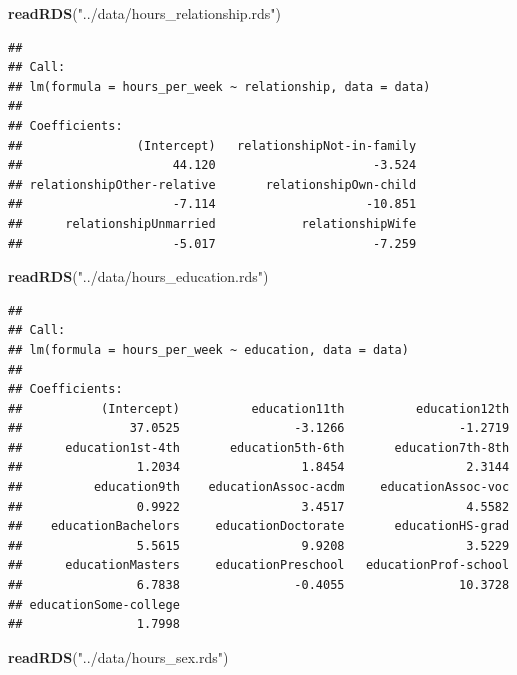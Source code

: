 \documentclass[]{article}
\newenvironment{Shaded}{\begin{snugshade}}{\end{snugshade}}
\newcommand{\KeywordTok}[1]{\textcolor[rgb]{0.13,0.29,0.53}{\textbf{#1}}}
\newcommand{\NormalTok}[1]{#1}
\newcommand{\StringTok}[1]{\textcolor[rgb]{0.31,0.60,0.02}{#1}}
\begin{document}
\begin{Shaded}
\begin{Highlighting}[]
\KeywordTok{readRDS}\NormalTok{(}\StringTok{"../data/hours\_relationship.rds"}\NormalTok{)}
\end{Highlighting}
\end{Shaded}

\begin{verbatim}
## 
## Call:
## lm(formula = hours_per_week ~ relationship, data = data)
## 
## Coefficients:
##                (Intercept)   relationshipNot-in-family  
##                     44.120                      -3.524  
## relationshipOther-relative       relationshipOwn-child  
##                     -7.114                     -10.851  
##      relationshipUnmarried            relationshipWife  
##                     -5.017                      -7.259
\end{verbatim}

\begin{Shaded}
\begin{Highlighting}[]
\KeywordTok{readRDS}\NormalTok{(}\StringTok{"../data/hours\_education.rds"}\NormalTok{)}
\end{Highlighting}
\end{Shaded}

\begin{verbatim}
## 
## Call:
## lm(formula = hours_per_week ~ education, data = data)
## 
## Coefficients:
##           (Intercept)          education11th          education12th  
##               37.0525                -3.1266                -1.2719  
##      education1st-4th       education5th-6th       education7th-8th  
##                1.2034                 1.8454                 2.3144  
##          education9th    educationAssoc-acdm     educationAssoc-voc  
##                0.9922                 3.4517                 4.5582  
##    educationBachelors     educationDoctorate       educationHS-grad  
##                5.5615                 9.9208                 3.5229  
##      educationMasters     educationPreschool   educationProf-school  
##                6.7838                -0.4055                10.3728  
## educationSome-college  
##                1.7998
\end{verbatim}

\begin{Shaded}
\begin{Highlighting}[]
\KeywordTok{readRDS}\NormalTok{(}\StringTok{"../data/hours\_sex.rds"}\NormalTok{)}
\end{Highlighting}
\end{Shaded}
\end{document}

